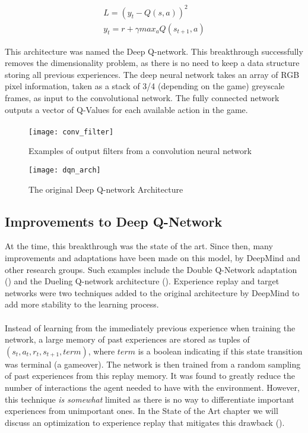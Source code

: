 \begin{align}
    L = (y_t - Q(s, a))^2 \label{equ:DQLoss} \\
    y_t = r + \gamma max_{a}Q(s_{t+1}, a) \label{equ:DQTarget}
\end{align}

This architecture was named the Deep Q-network. This breakthrough successfully removes the dimensionality problem, as there is no need to keep a data structure storing all previous experiences. The deep neural network takes an array of RGB pixel information, taken as a stack of 3/4 (depending on the game) greyscale frames, as input to the convolutional network. The fully connected network outputs a vector of Q-Values for each available action in the game. \paragraph{}

\begin{figure}[H]
    \centering
    \texttt{[image: conv\_filter]}
    \caption{Examples of output filters from a convolution neural network}
\end{figure}
\begin{figure}[H]
    \centering
    \texttt{[image: dqn\_arch]}
    \caption{The original Deep Q-network Architecture}
\end{figure}

\subsection{Improvements to Deep Q-Network}
At the time, this breakthrough was the state of the art. Since then, many improvements and adaptations have been made on this model, by DeepMind and other research groups. Such examples include the Double Q-Network adaptation (\cite{doubleq}) and the Dueling Q-network architecture (\cite{dueling}). Experience replay and target networks were two techniques added to the original architecture by DeepMind to add more stability to the learning process. \paragraph{}

Instead of learning from the immediately previous experience when training the network, a large memory of past experiences are stored as tuples of $(s_t, a_t, r_{t}, s_{t+1}, term)$, where $term$ is a boolean indicating if this state transition was terminal (a gameover). The network is then trained from a random sampling of past experiences from this replay memory. It was found to greatly reduce the number of interactions the agent needed to have with the environment. However, this technique \textit{is somewhat} limited as there is no way to differentiate important experiences from unimportant ones. In the State of the Art chapter we will discuss an optimization to experience replay that mitigates this drawback (\cite{human}). \paragraph{}

